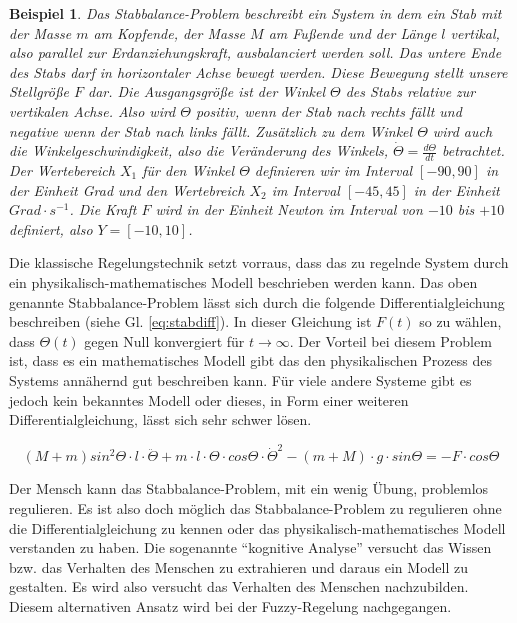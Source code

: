 \documentclass[12pt,a4paper,bibliography=totocnumbered,listof=totocnumbered]{article}
\theoremstyle{Umgebung}
\begin{document}
\newtheorem{stabbalance}{Beispiel}
\begin{stabbalance} 
	Das Stabbalance-Problem beschreibt ein System in dem ein Stab mit der Masse $m$ am Kopfende, der Masse $M$ am Fußende und der Länge $l$ vertikal, also parallel zur Erdanziehungskraft, ausbalanciert werden soll. Das untere Ende des Stabs darf in horizontaler Achse bewegt werden. Diese Bewegung stellt unsere Stellgröße $F$ dar. Die Ausgangsgröße ist der Winkel $\Theta$ des Stabs relative zur vertikalen Achse. Also wird $\Theta$ positiv, wenn der Stab nach rechts fällt und negative wenn der Stab nach links fällt. Zusätzlich zu dem Winkel $\Theta$ wird auch die Winkelgeschwindigkeit, also die Veränderung des Winkels, $\dot{\Theta} = \frac{d\Theta}{dt}$ betrachtet. Der Wertebereich $X_1$ für den Winkel $\Theta$ definieren wir im Interval $\left[-90,90\right]$ in der Einheit Grad und den Wertebreich $X_2$ im Interval $\left[-45, 45\right]$ in der Einheit $Grad \cdot s^{-1}$. Die Kraft $F$ wird in der Einheit Newton im Interval von $-10$ bis $+10$ definiert, also $Y=\left[-10, 10\right]$.
\end{stabbalance}

Die klassische Regelungstechnik setzt vorraus, dass das zu regelnde System durch ein physikalisch-mathematisches Modell beschrieben werden kann. Das oben genannte Stabbalance-Problem lässt sich durch die folgende Differentialgleichung beschreiben (siehe Gl. \ref{eq:stabdiff}). In dieser Gleichung ist $F(t)$ so zu wählen, dass $\Theta(t)$ gegen Null konvergiert für $t \rightarrow \infty$. Der Vorteil bei diesem Problem ist, dass es ein mathematisches Modell gibt das den physikalischen Prozess des Systems annähernd gut beschreiben kann. Für viele andere Systeme gibt es jedoch kein bekanntes Modell oder dieses, in Form einer weiteren Differentialgleichung, lässt sich sehr schwer lösen.

\label{eq:stabdiff}
\begin{equation}
(M+m)sin^2 \Theta \cdot l \cdot \ddot{\Theta} + m \cdot l \cdot \Theta \cdot cos\Theta \cdot \dot{\Theta}^2 - (m + M) \cdot g \cdot sin \Theta = -F \cdot cos \Theta
\end{equation}

Der Mensch kann das Stabbalance-Problem, mit ein wenig Übung, problemlos regulieren. Es ist also doch möglich das Stabbalance-Problem zu regulieren ohne die Differentialgleichung zu kennen oder das physikalisch-mathematisches Modell verstanden zu haben. Die sogenannte \enquote{kognitive Analyse} versucht das Wissen bzw. das Verhalten des Menschen zu extrahieren und daraus ein Modell zu gestalten. Es wird also versucht das Verhalten des Menschen nachzubilden. Diesem alternativen Ansatz wird bei der Fuzzy-Regelung nachgegangen.
\end{document}

